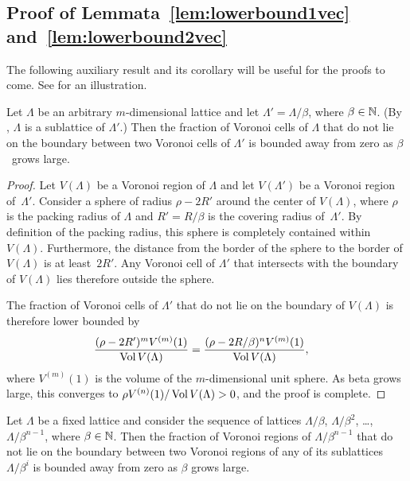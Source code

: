 \begin{subappendices}
  \section{Proof of Lemmata~\ref{lem:lowerbound1vec}
  and~\ref{lem:lowerbound2vec}}\label{app:lbvecproofs}

  The following auxiliary result and its corollary will be useful for the proofs
  to come. See  for an illustration.

  \begin{lemma}
    \label{lem:subvoronoi}
    Let $\Lambda$ be an arbitrary $m$-dimensional lattice and let $\Lambda' =
    \Lambda/\beta$, where $\beta \in {\mathbb{N}}$. (By ,
    $\Lambda$ is a sublattice of $\Lambda'$.) Then the fraction of Voronoi cells
    of $\Lambda$ that do not lie on the boundary between two Voronoi cells of
    $\Lambda'$ is bounded away from zero as $\beta$~grows large.
  \end{lemma}

  \begin{proof}
    Let $V(\Lambda)$ be a Voronoi region of $\Lambda$ and let $V(\Lambda')$ be a
    Voronoi region of~$\Lambda'$.  Consider a sphere of radius $\rho - 2R'$
    around the center of $V(\Lambda)$, where $\rho$ is the
    packing radius of $\Lambda$ and $R' = R/\beta$ is
    the covering radius of~$\Lambda'$. By definition of the packing radius, this
    sphere is completely contained within $V(\Lambda)$. Furthermore, the
    distance from the border of the sphere to the border of $V(\Lambda)$ is
    at least~$2R'$. Any Voronoi cell of $\Lambda'$ that intersects
    with the boundary of $V(\Lambda)$ lies therefore outside the sphere. 
    
    The fraction of Voronoi cells of $\Lambda'$ that do not lie on the boundary
    of $V(\Lambda)$ is therefore lower bounded by
    \begin{align*}
      \frac{(\rho - 2R')^m V^{(m)}(1)}{\operatorname{Vol} V(\Lambda)} &= \frac{(\rho -
      2R/\beta)^n V^{(m)}(1)}{\operatorname{Vol} V(\Lambda)},
    \end{align*}
    where $V^{(m)}(1)$ is the volume of the $m$-dimensional unit sphere. As beta
    grows large, this converges to $\rho V^{(n)}(1) / \operatorname{Vol} V(\Lambda) > 0$, and
    the proof is complete.
  \end{proof}

  \begin{corollary}
    Let $\Lambda$ be a fixed lattice and consider the sequence of lattices
    $\Lambda/\beta$, $\Lambda/\beta^2$, \dots, $\Lambda/\beta^{n-1}$, where
    $\beta \in {\mathbb{N}}$. Then the fraction of Voronoi regions of
    $\Lambda/\beta^{n-1}$ that do not lie on the boundary between two Voronoi
    regions of any of its sublattices $\Lambda/\beta^i$ is bounded
    away from zero as $\beta$ grows large.
  \end{corollary}


\end{subappendices}
